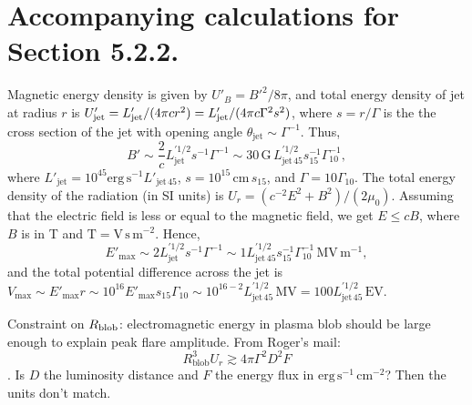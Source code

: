 \documentclass[linenumbers]{aastex62}
\begin{document}
\section{Accompanying calculations for Section 5.2.2.}

Magnetic energy density is given by $U'_B = B'^2 / 8\pi$, and total energy density of jet at radius $r$ is
$U'_{\rm jet} = L'_{\rm jet} / (4\pi c r^2) = L'_{\rm jet} / (4\pi c \Gamma^2 s^2)$, where $s = r / \Gamma$ is the the cross section of the jet with opening angle $\theta_\mathrm{jet} \sim \Gamma^{-1}$. Thus, 
\begin{equation}
 B' \sim \frac{2}{c} L_\mathrm{jet}^{\prime 1/2} s^{-1}\Gamma^{-1} \sim 30\,\mathrm{G}\,L_\mathrm{jet\,45}^{\prime1/2} s_{15}^{-1}\Gamma_{10}^{-1},
\end{equation}
where $L'_\mathrm{jet} =10^{45} \mathrm{erg}\,\mathrm{s}^{-1} L'_\mathrm{jet\,45}$, $s = 10^{15}\,\mathrm{cm}\,s_{15}$, and $\Gamma = 10\Gamma_{10}$.
The total energy density of the radiation (in SI units) is $U_r = (c^{-2}E^2 + B^2) / (2\mu_0)$. Assuming that the electric field is less or equal to the magnetic field, we get $E \leqslant cB$, where $B$ is in T and $\mathrm{T} = \mathrm{V}\,\mathrm{s}\,\mathrm{m}^{-2}$. Hence, 
\begin{equation}
E'_\mathrm{max} \sim 2 L_\mathrm{jet}^{\prime1/2} s^{-1}\Gamma^{-1} \sim 1L_\mathrm{jet\,45}^{\prime1/2} s_{15}^{-1}\Gamma_{10}^{-1}\,\mathrm{MV}\,\mathrm{m}^{-1},
\end{equation}
and the total potential difference across the jet is $V_\mathrm{max} \sim E'_\mathrm{max} r \sim 10^{16}E'_\mathrm{max} s_{15}\Gamma_{10}\sim 10^{16-2}L_\mathrm{jet\,45}^{\prime 1/2}\,\mathrm{MV} = 100L_\mathrm{jet\,45}^{\prime 1/2}\,\mathrm{EV}$.

Constraint on $R_{\rm blob}$: electromagnetic energy in plasma blob should be large enough to explain peak flare amplitude. 
From Roger's mail: 
$$ R_\mathrm{blob}^3 U_r \gtrsim 4\pi\Gamma^2 D^2 F $$. Is $D$ the luminosity distance and $F$ the energy flux in $\mathrm{erg}\,\mathrm{s}^{-1}\,\mathrm{cm}^{-2}$? Then the units don't match. 
\end{document}
